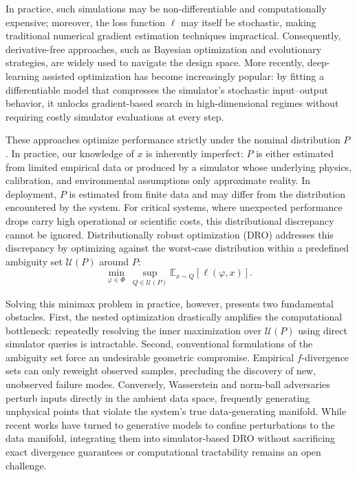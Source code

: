 \documentclass[11pt]{article}
\newcommand{\E}{\mathbb{E}}
\newcommand{\Phibox}{\Phi}
\newcommand{\design}{\varphi}
\newcommand{\amb}{\mathcal{U}}
\begin{document}
In practice, such simulations may be non-differentiable and computationally expensive; moreover, the loss function $\ell$ may itself be stochastic, making traditional numerical gradient estimation techniques impractical.
Consequently, derivative-free approaches, such as Bayesian optimization and evolutionary strategies, are widely used to navigate the design space. More recently, deep-learning assisted optimization has become increasingly popular: by fitting a differentiable model that compresses the simulator's stochastic input--output behavior, it unlocks gradient-based search in high-dimensional regimes without requiring costly simulator evaluations at every step.

These approaches optimize performance strictly under the nominal distribution $P$. In practice, our knowledge of $x$ is inherently imperfect: $P$ is either estimated from limited empirical data or produced by a simulator whose underlying physics, calibration, and environmental assumptions only approximate reality. In deployment, $P$ is estimated from finite data and may differ from the
distribution encountered by the system. 
For critical systems, where unexpected performance drops carry high operational or scientific costs, this distributional discrepancy cannot be ignored. Distributionally robust optimization (DRO) addresses this discrepancy by optimizing against the worst-case distribution within a predefined ambiguity set $\amb(P)$ around $P$:
\begin{equation}
  \label{eq:dro}
  \min_{\design \in \Phibox}\ \sup_{Q \in \amb(P)}
  \E_{x \sim Q}[\ell(\design,x)].
\end{equation}

Solving this minimax problem in practice, however, presents two fundamental obstacles. First, the nested optimization drastically amplifies the computational bottleneck: repeatedly resolving the inner maximization over $\amb(P)$ using direct simulator queries is intractable. Second, conventional formulations of the ambiguity set force an undesirable geometric compromise. Empirical $f$-divergence sets can only reweight observed samples, precluding the discovery of new, unobserved failure modes. Conversely, Wasserstein and norm-ball adversaries perturb inputs directly in the ambient data space, frequently generating unphysical points that violate the system's true data-generating manifold. While recent works have turned to generative models to confine perturbations to the data manifold, integrating them into simulator-based DRO without sacrificing exact divergence guarantees or computational tractability remains an open challenge.
\end{document}
